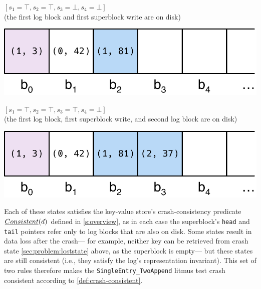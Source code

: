 \begin{example}
\begin{enumerate}[label={\raisebox{2\baselineskip}[0pt][0pt]{(\arabic*)}},ref=(\arabic*)]
\item 
\begin{minipage}[b]{0.5\textwidth}
$[s_1 = \top, s_2 = \top, s_3 = \bot, s_4 = \bot]$\\
(the first log block and first superblock write are on disk)
\end{minipage}\quad%
\begin{minipage}{0.4\textwidth}
\vspace{-1.2em}
\includegraphics[width=\textwidth]{figs/sec3-4.pdf}
\end{minipage}

\item 
\begin{minipage}[b]{0.5\textwidth}
$[s_1 = \top, s_2 = \top, s_3 = \top, s_4 = \bot]$\\
(the first log block, first superblock write, and second log block are on disk)
\end{minipage}\quad%
\begin{minipage}{0.4\textwidth}
\vspace{-1.2em}
\includegraphics[width=\textwidth]{figs/sec3-5.pdf}
\end{minipage}
\end{enumerate}
%
Each of these states satisfies the key-value store's crash-consistency predicate $\emph{Consistent}(d)$
defined in \cref{s:overview},
as in each case the superblock's \texttt{head} and \texttt{tail} pointers
refer only to log blocks that are also on disk.
Some states result in data loss after the crash---%
for example, neither key can be retrieved from crash state \ref{sec:problem:loststate} above, as the superblock is empty---%
but these states are still consistent
(i.e., they satisfy the log's representation invariant).
This set of two rules therefore makes the \texttt{SingleEntry_TwoAppend} litmus test crash consistent according to \cref{def:crash-consistent}.


\end{example}
